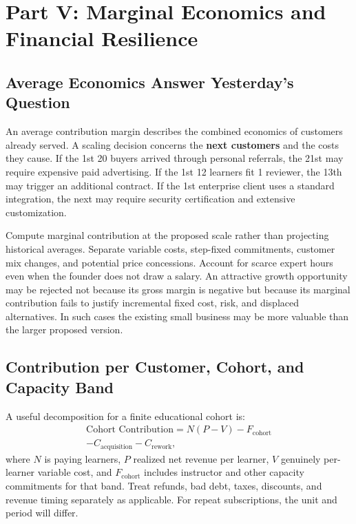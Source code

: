 \section*{Part V: Marginal Economics and Financial Resilience}
\label{sec:part5_marginal_economics}

\subsection{Average Economics Answer Yesterday's Question}
\label{sec:average_economics_yesterday}

An average contribution margin describes the combined economics of customers already served. A scaling decision concerns the \textbf{next customers} and the costs they cause. If the 1st 20 buyers arrived through personal referrals, the 21st may require expensive paid advertising. If the 1st 12 learners fit 1 reviewer, the 13th may trigger an additional contract. If the 1st enterprise client uses a standard integration, the next may require security certification and extensive customization.

Compute marginal contribution at the proposed scale rather than projecting historical averages. Separate variable costs, step-fixed commitments, customer mix changes, and potential price concessions. Account for scarce expert hours even when the founder does not draw a salary. An attractive growth opportunity may be rejected not because its gross margin is negative but because its marginal contribution fails to justify incremental fixed cost, risk, and displaced alternatives. In such cases the existing small business may be more valuable than the larger proposed version.

\subsection{Contribution per Customer, Cohort, and Capacity Band}
\label{sec:contribution_per_cohort_band}

A useful decomposition for a finite educational cohort is:
\begin{multline}
\text{Cohort Contribution} = N(P - V) - F_{\mathrm{cohort}} \\
- C_{\mathrm{acquisition}} - C_{\mathrm{rework}},
\label{eq:cohort_contribution}
\end{multline}
where $N$ is paying learners, $P$ realized net revenue per learner, $V$ genuinely per-learner variable cost, and $F_{\mathrm{cohort}}$ includes instructor and other capacity commitments for that band. Treat refunds, bad debt, taxes, discounts, and revenue timing separately as applicable. For repeat subscriptions, the unit and period will differ.

